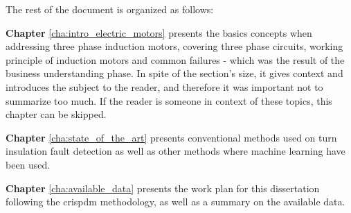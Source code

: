 The rest of the document is organized as follows:

\textbf{Chapter} \ref{cha:intro_electric_motors} presents the basics concepts when addressing three phase induction motors, covering three phase circuits, working principle of induction motors and common failures - which was the result of the business understanding phase. In spite of the section's size, it gives context and introduces the subject to the reader, and therefore it was important not to summarize too much. If the reader is someone in context of these topics, this chapter can be skipped.

\textbf{Chapter} \ref{cha:state_of_the_art} presents conventional methods used on turn insulation fault detection as well as other methods where machine learning have been used.

\textbf{Chapter} \ref{cha:available_data} presents the work plan for this dissertation following the \acrshort{crispdm} methodology, as well as a summary on the available data.
